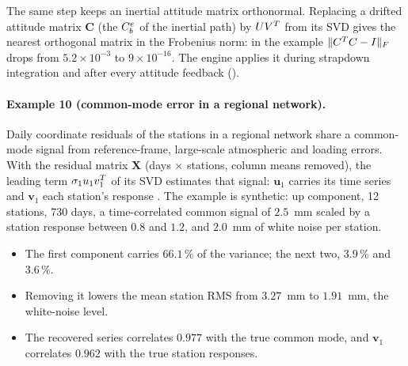 \documentclass[main.tex]{subfiles}
\begin{document}
The same step keeps an inertial attitude matrix orthonormal.  Replacing a
drifted attitude matrix $\bm{C}$ (the $C_b^e$ of the inertial path) by
$UV^{T}$ from its SVD gives the nearest orthogonal matrix in the
Frobenius norm: in the example
$\lVert C^{T}C - I\rVert_F$ drops from $5.2\times10^{-3}$ to
$9\times10^{-16}$.  The engine applies it during strapdown integration and
after every attitude feedback ().

\paragraph{Example 10 (common-mode error in a regional network).}
\label{la:ex10}%
Daily coordinate residuals of the stations in a regional network share a
common-mode signal from reference-frame, large-scale atmospheric and
loading errors.  With the residual matrix $\bm{X}$ (days $\times$ stations,
column means removed), the leading term $\sigma_1u_1v_1^{T}$ of its
SVD estimates that signal: $\bm{u}_1$ carries its time series and
$\bm{v}_1$ each station's response \cite{dong2006spatiotemporal}.  The
example is synthetic: up component, 12 stations, 730 days, a
time-correlated common signal of $2.5$~mm scaled by a station response
between $0.8$ and $1.2$, and $2.0$~mm of white noise per station.
\begin{itemize}[leftmargin=*, itemsep=1pt]
\item The first component carries $66.1\,\%$ of the variance; the next two,
      $3.9\,\%$ and $3.6\,\%$.
\item Removing it lowers the mean station RMS from $3.27$~mm to $1.91$~mm,
      the white-noise level.
\item The recovered series correlates $0.977$ with the true common mode, and
      $\bm{v}_1$ correlates $0.962$ with the true station responses.
\end{itemize}
\end{document}
